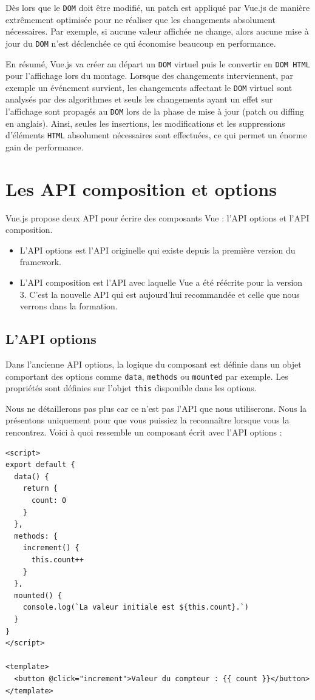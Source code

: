 \documentclass{article}
\begin{document}
Dès lors que le {\tt DOM} doit être modifié, un patch est appliqué par {\color{monOrange}Vue.js} de manière extrêmement optimisée pour ne réaliser que les changements absolument nécessaires. Par exemple, si aucune valeur affichée ne change, alors aucune mise à jour du {\tt DOM} n'est déclenchée ce qui économise beaucoup en performance.

En résumé, {\color{monOrange}Vue.js} va créer au départ un {\tt DOM} virtuel puis le convertir en {\tt DOM HTML} pour l'affichage lors du montage. Lorsque des changements interviennent, par exemple un événement survient, les changements affectant le {\tt DOM} virtuel sont analysés par des algorithmes et seuls les changements ayant un effet sur l'affichage sont propagés au {\tt DOM} lors de la phase de mise à jour (patch ou diffing en anglais). Ainsi, seules les insertions, les modifications et les suppressions d'éléments {\tt HTML} absolument nécessaires sont effectuées, ce qui permet un énorme gain de performance.


\section{Les API composition et options}
{\color{monOrange}Vue.js} propose deux API pour écrire des composants {\color{monOrange}Vue} : l'API options et l'API composition.
\begin{itemize}
\item L'API options est l'API originelle qui existe depuis la première version du {\color{monOrange}framework}.
\item L'API composition est l'API avec laquelle {\color{monOrange}Vue} a été réécrite pour la version 3. C'est la nouvelle API qui est aujourd'hui recommandée et celle que nous verrons dans la formation.
\end{itemize}
\subsection{L'API options}
Dans l'ancienne API options, la logique du composant est définie dans un objet comportant des options comme {\tt data}, {\tt methods} ou {\tt mounted} par exemple. Les propriétés sont définies sur l'objet {\tt this} disponible dans les options.

Nous ne détaillerons pas plus car ce n'est pas l'API que nous utiliserons. Nous la présentons uniquement pour que vous puissiez la reconnaître lorsque vous la rencontrez. Voici à quoi ressemble un composant écrit avec l'API options :
\begin{verbatim}
<script>
export default {
  data() {
    return {
      count: 0
    }
  },
  methods: {
    increment() {
      this.count++
    }
  },
  mounted() {
    console.log(`La valeur initiale est ${this.count}.`)
  }
}
</script>

<template>
  <button @click="increment">Valeur du compteur : {{ count }}</button>
</template>
\end{verbatim} 
\end{document}
